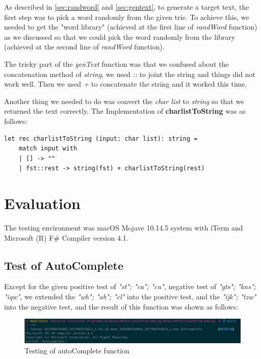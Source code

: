 \documentclass{article}
\begin{document}
As described in \ref{sec:randword} and \ref{sec:gentext}, to generate a target text, the first step was to pick a word randomly from the given trie. To achieve this, we needed to get the "word library" (achieved at the first line of \emph{randWord} function) as we discussed so that we could pick the word randomly from the library (achieved at the second line of \emph{randWord} function).

The tricky part of the \emph{genText} function was that we confused about the concatenation method of \emph{string}, we used \emph{::} to joint the string and things did not work well. Then we used \emph{+} to concatenate the string and it worked this time.

Another thing we needed to do was convert the \emph{char list} to \emph{string} so that we returned the text correctly. The Implementation of \textbf{charlistToString} was as follows:

\begin{lstlisting}
let rec charlistToString (input: char list): string = 
    match input with
    | [] -> ""
    | fst::rest -> string(fst) + charlistToString(rest)
\end{lstlisting}

\section{Evaluation}

The testing environment was macOS Mojave 10.14.5 system with iTerm and Microsoft (R) F\# Compiler version 4.1.

\subsection{Test of AutoComplete}

Except for the given positive test of \emph{"st"; "ca"; "cu"}, negative test of \emph{"gts"; "kns"; "iqw"}, we extended the \emph{"wh"; "ab"; "cl"} into the positive test, and the \emph{"ijk"; "tzw"} into the negative test, and the result of this function was shown as follows:

\begin{figure}[htbp]
      \centering
      \includegraphics[width=\linewidth]{autocomplete}
      \caption{Testing of autoComplete function}
      \label{fig:autocomplete}
\end{figure}
\end{document}
